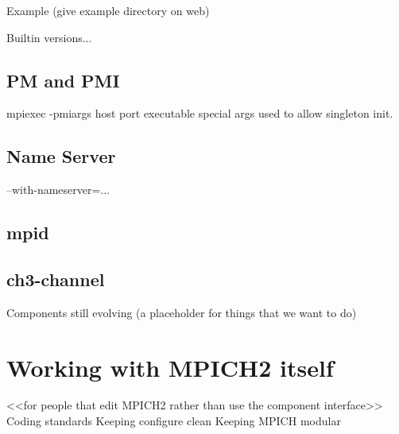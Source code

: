 \documentclass{report}
\begin{document}
    Example (give example directory on web)

    Builtin versions...

\section{PM and PMI}

mpiexec 
    -pmiargs host port executable
special args used to allow singleton init.

\section{Name Server}

    --with-nameserver=...

\section{mpid}
\section{ch3-channel}

          Components still evolving (a placeholder for things that we want to do)

\chapter{Working with MPICH2 itself}
          <<for people that edit MPICH2 rather than use the component interface>>
          Coding standards
          Keeping configure clean
          Keeping MPICH modular
          
\end{document}
